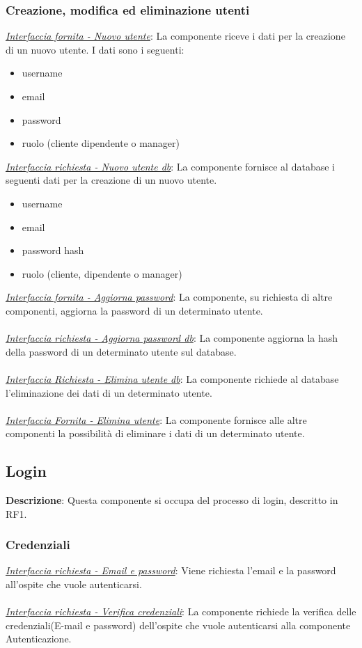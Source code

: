 \documentclass{report}
\begin{document}
\subsubsection*{ \indent  \indent Creazione, modifica ed eliminazione utenti}
\uline{\textit{Interfaccia fornita - Nuovo utente}}: 
La componente riceve i dati per la creazione di un nuovo utente. I dati sono i seguenti:
\begin{itemize}
	\item username
	\item email
	\item password
	\item ruolo (cliente dipendente o manager)
\end{itemize}
\uline{\textit{Interfaccia richiesta - Nuovo utente db}}: 
La componente fornisce al database i seguenti dati per la creazione di un nuovo utente.
\begin{itemize}
	\item username
	\item email
	\item password hash
	\item ruolo (cliente, dipendente o manager)
	
\end{itemize}
\uline{\textit{Interfaccia fornita - Aggiorna password}}:
La componente, su richiesta di altre componenti, aggiorna la password di un determinato utente.\\\\
\uline{\textit{Interfaccia richiesta - Aggiorna password db}}: 
La componente aggiorna la hash della password di un determinato utente sul database.  \\\\
\uline{\textit{Interfaccia Richiesta - Elimina utente db}}: 
La componente richiede al database l'eliminazione dei dati di un determinato utente.\\\\
\uline{\textit{Interfaccia Fornita - Elimina utente}}: 
La componente fornisce alle altre componenti la possibilità di eliminare i dati di un determinato utente.

\subsection*{Login}
\textbf{Descrizione}: Questa componente si occupa del processo di login, descritto in RF1.
\subsubsection*{\indent \indent Credenziali}
\uline{\textit{Interfaccia richiesta - Email e password}}: 
Viene richiesta l'email e la password all'ospite che vuole autenticarsi.\\ \\ 
\uline{\textit{Interfaccia richiesta - Verifica credenziali}}: 
La componente richiede la verifica delle credenziali(E-mail e password) dell'ospite che vuole autenticarsi alla componente Autenticazione.
\end{document}
